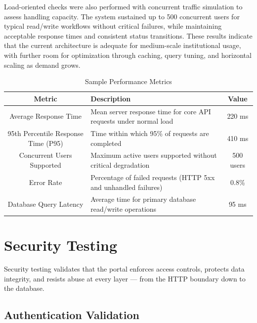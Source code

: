 Load-oriented checks were also performed with concurrent traffic simulation to assess handling capacity. The system sustained up to 500 concurrent users for typical read/write workflows without critical failures, while maintaining acceptable response times and consistent status transitions. These results indicate that the current architecture is adequate for medium-scale institutional usage, with further room for optimization through caching, query tuning, and horizontal scaling as demand grows.

\begin{table}[h]
\centering
\caption{Sample Performance Metrics}
\begin{tabularx}{\textwidth}{|c|X|c|}
\hline
\textbf{Metric} & \textbf{Description} & \textbf{Value} \\
\hline
Average Response Time & Mean server response time for core API requests under normal load & 220 ms \\
\hline
95th Percentile Response Time (P95) & Time within which 95\% of requests are completed & 410 ms \\
\hline
Concurrent Users Supported & Maximum active users supported without critical degradation & 500 users \\
\hline
Error Rate & Percentage of failed requests (HTTP 5xx and unhandled failures) & 0.8\% \\
\hline
Database Query Latency & Average time for primary database read/write operations & 95 ms \\
\hline
\end{tabularx}
\end{table}


\section{Security Testing}

Security testing validates that the portal enforces access controls, protects data integrity,
and resists abuse at every layer — from the HTTP boundary down to the database.

\subsection{Authentication Validation}

